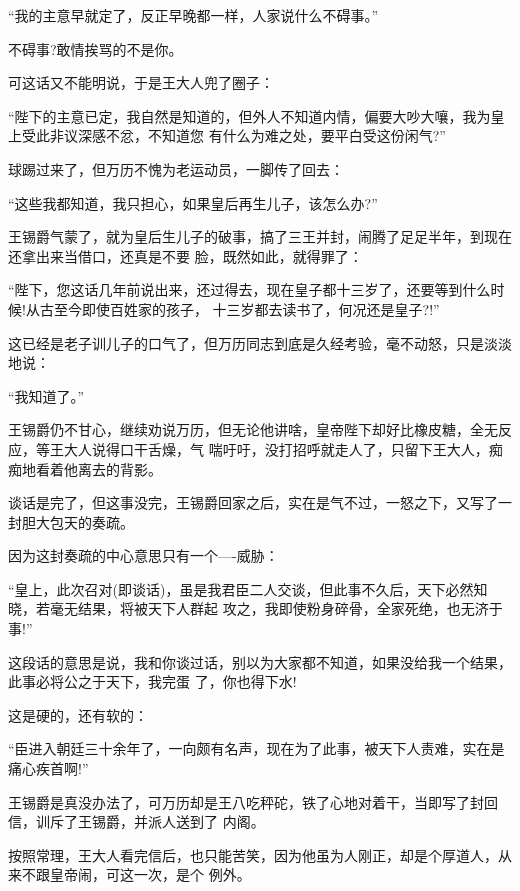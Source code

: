 \documentclass[11pt,a4paper,onecolumn]{article}
\begin{document}
``我的主意早就定了，反正早晚都一样，人家说什么不碍事。''

不碍事?敢情挨骂的不是你。

可这话又不能明说，于是王大人兜了圈子：

``陛下的主意已定，我自然是知道的，但外人不知道内情，偏要大吵大嚷，我为皇上受此非议深感不忿，不知道您
有什么为难之处，要平白受这份闲气?''

球踢过来了，但万历不愧为老运动员，一脚传了回去：

``这些我都知道，我只担心，如果皇后再生儿子，该怎么办?''

王锡爵气蒙了，就为皇后生儿子的破事，搞了三王并封，闹腾了足足半年，到现在还拿出来当借口，还真是不要
脸，既然如此，就得罪了：

``陛下，您这话几年前说出来，还过得去，现在皇子都十三岁了，还要等到什么时候!从古至今即使百姓家的孩子，
十三岁都去读书了，何况还是皇子?!''

这已经是老子训儿子的口气了，但万历同志到底是久经考验，毫不动怒，只是淡淡地说：

``我知道了。''

王锡爵仍不甘心，继续劝说万历，但无论他讲啥，皇帝陛下却好比橡皮糖，全无反应，等王大人说得口干舌燥，气
喘吁吁，没打招呼就走人了，只留下王大人，痴痴地看着他离去的背影。

谈话是完了，但这事没完，王锡爵回家之后，实在是气不过，一怒之下，又写了一封胆大包天的奏疏。

因为这封奏疏的中心意思只有一个----威胁：

``皇上，此次召对(即谈话)，虽是我君臣二人交谈，但此事不久后，天下必然知晓，若毫无结果，将被天下人群起
攻之，我即使粉身碎骨，全家死绝，也无济于事!''

这段话的意思是说，我和你谈过话，别以为大家都不知道，如果没给我一个结果，此事必将公之于天下，我完蛋
了，你也得下水!

这是硬的，还有软的：

``臣进入朝廷三十余年了，一向颇有名声，现在为了此事，被天下人责难，实在是痛心疾首啊!''

王锡爵是真没办法了，可万历却是王八吃秤砣，铁了心地对着干，当即写了封回信，训斥了王锡爵，并派人送到了
内阁。

按照常理，王大人看完信后，也只能苦笑，因为他虽为人刚正，却是个厚道人，从来不跟皇帝闹，可这一次，是个
例外。

\section[\thesection]{}
\end{document}
